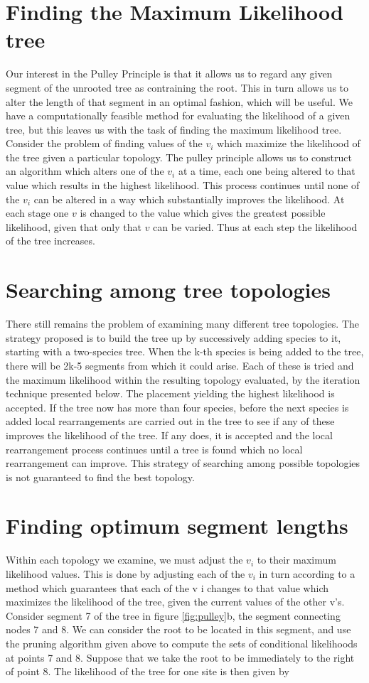 \section{Finding the Maximum Likelihood tree}
Our interest in the Pulley Principle is that it allows us to regard any given segment of the unrooted tree as contraining the root. This in turn allows us to alter the length of that segment in an optimal fashion, which will be useful.
We have a computationally feasible method for evaluating the likelihood of a given tree, but this leaves us with the task of finding the maximum likelihood tree.
\\
Consider the problem of finding values of the $v_i$ which maximize the likelihood of the tree given a particular topology.
The pulley principle allows us to construct an algorithm which alters one of the $v_i$ at a time, each one being altered to that value which results in the highest likelihood. This process continues until none of the $v_i$ can be altered
in a way which substantially improves the likelihood. At each stage one $v$ is changed to the value which gives the greatest possible likelihood, given that only that $v$ can be varied. Thus at each step the likelihood of the tree increases.

\section{Searching among tree topologies}
There still remains the problem of examining many different tree topologies.
The strategy proposed is to build the tree up by successively adding species to it, starting with a two-species tree. When the k-th species is being added to the tree, there will be 2k-5 segments from which it could arise.
Each of these is tried and the maximum likelihood within the resulting topology evaluated, by the iteration technique presented below.
The placement yielding the highest likelihood is accepted.
If the tree now has more than four species, before the next species is added local rearrangements are carried out in the tree to see if any of these improves the likelihood of the tree.
If any does, it is accepted and the local rearrangement process continues until a tree is found which no local rearrangement can improve.
This strategy of searching among possible topologies is not guaranteed to find the best topology.

\section{Finding optimum segment lengths}
Within each topology we examine, we must adjust the $v_i$ to their maximum likelihood values.
This is done by adjusting each of the $v_i$ in turn according to a method which guarantees that each of the v i changes to that value which maximizes the likelihood of the tree, given the current values of the other v's.
Consider segment 7 of the tree in figure \ref{fig:pulley}b, the segment connecting nodes 7 and 8. We can consider the root to be located in this segment, and use the pruning algorithm given above to compute the sets of conditional likelihoods at points 7 and 8. Suppose that we take the root to be immediately to the right of point 8. The likelihood of the tree for one site is then given by

